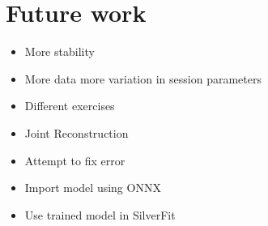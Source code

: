 \section{Future work}

\begin{itemize}
  \item More stability
  \item More data more variation in session parameters
  \item Different exercises
  \item Joint Reconstruction
  \item Attempt to fix error
  \item Import model using ONNX 
  \item Use trained model in SilverFit
\end{itemize}